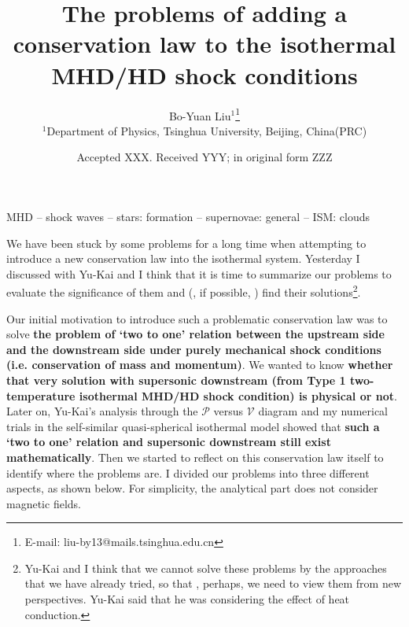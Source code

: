 \documentclass[fleqn,usenatbib]{mnras}
\title[Report on September 22]{The problems of adding a conservation law to the isothermal MHD/HD shock conditions}
\author[Bo-Yuan Liu]{Bo-Yuan Liu$^{1}$\thanks{E-mail: liu-by13@mails.tsinghua.edu.cn}
\\
$^{1}$Department of Physics, Tsinghua University, Beijing, China(PRC)\\
}
\date{Accepted XXX. Received YYY; in original form ZZZ}
\begin{document}
\label{firstpage}
\pagerange{\pageref{firstpage}--\pageref{lastpage}}
\maketitle
\begin{keywords}
MHD -- shock waves -- stars: formation -- supernovae: general -- ISM: clouds
\end{keywords}



 
We have been stuck by some problems for a long time when attempting to introduce a new conservation law into the isothermal system. Yesterday I discussed with Yu-Kai and I think that it is time to summarize our problems to evaluate the significance of them and (, if possible, ) find their solutions\footnote{Yu-Kai and I think that we cannot solve these problems by the approaches that we have already tried, so that , perhaps, we need to view them from new perspectives. Yu-Kai said that he was considering the effect of heat conduction.}.

Our initial motivation to introduce such a problematic conservation law was to solve \textbf{the problem of `two to one' relation between the upstream side and the downstream side under purely mechanical shock conditions (i.e. conservation of mass and momentum)}. We wanted to know \textbf{whether that very solution with supersonic downstream (from Type 1 two-temperature isothermal MHD/HD shock condition) is physical or not}. Later on, Yu-Kai's analysis through the $\mathcal{P}$ versus $\mathcal{V}$ diagram and my numerical trials in the self-similar quasi-spherical isothermal model showed that \textbf{such a `two to one' relation and supersonic downstream still exist mathematically}. Then we started to reflect on this conservation law itself to identify where the problems are. I divided our problems into three different aspects, as shown below. For simplicity, the analytical part does not consider magnetic fields.
\end{document}
